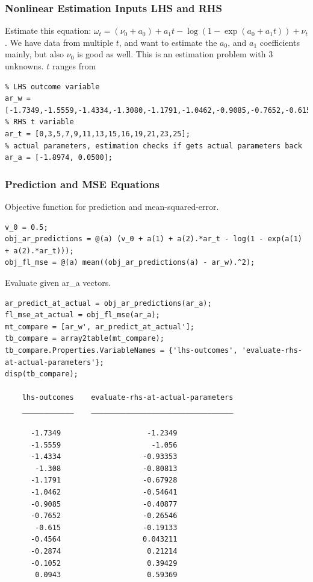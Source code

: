 \documentclass[
]{book}
\begin{document}
\hypertarget{nonlinear-estimation-inputs-lhs-and-rhs}{%
\subsubsection{Nonlinear Estimation Inputs LHS and RHS}\label{nonlinear-estimation-inputs-lhs-and-rhs}}

Estimate this equation:
\(\omega_t =\left(\nu_0 +a_0 \right)+a_1 t-\log \left(1-\exp \left(a_0 +a_1 t\right)\right)+\nu_t\).
We have data from multiple \(t\), and want to estimate the \(a_0\), and
\(a_1\) coefficients mainly, but also \(\nu_0\) is good as well. This is an
estimation problem with 3 unknowns. \(t\) ranges from

\begin{verbatim}
% LHS outcome variable
ar_w = [-1.7349,-1.5559,-1.4334,-1.3080,-1.1791,-1.0462,-0.9085,-0.7652,-0.6150,-0.4564,-0.2874,-0.1052,0.0943];
% RHS t variable
ar_t = [0,3,5,7,9,11,13,15,16,19,21,23,25];
% actual parameters, estimation checks if gets actual parameters back
ar_a = [-1.8974, 0.0500];
\end{verbatim}

\hypertarget{prediction-and-mse-equations}{%
\subsubsection{Prediction and MSE Equations}\label{prediction-and-mse-equations}}

Objective function for prediction and mean-squared-error.

\begin{verbatim}
v_0 = 0.5;
obj_ar_predictions = @(a) (v_0 + a(1) + a(2).*ar_t - log(1 - exp(a(1) + a(2).*ar_t)));
obj_fl_mse = @(a) mean((obj_ar_predictions(a) - ar_w).^2);
\end{verbatim}

Evaluate given ar\_a vectors.

\begin{verbatim}
ar_predict_at_actual = obj_ar_predictions(ar_a);
fl_mse_at_actual = obj_fl_mse(ar_a);
mt_compare = [ar_w', ar_predict_at_actual'];
tb_compare = array2table(mt_compare);
tb_compare.Properties.VariableNames = {'lhs-outcomes', 'evaluate-rhs-at-actual-parameters'};
disp(tb_compare);

    lhs-outcomes    evaluate-rhs-at-actual-parameters
    ____________    _________________________________

      -1.7349                    -1.2349             
      -1.5559                     -1.056             
      -1.4334                   -0.93353             
       -1.308                   -0.80813             
      -1.1791                   -0.67928             
      -1.0462                   -0.54641             
      -0.9085                   -0.40877             
      -0.7652                   -0.26546             
       -0.615                   -0.19133             
      -0.4564                   0.043211             
      -0.2874                    0.21214             
      -0.1052                    0.39429             
       0.0943                    0.59369             
\end{verbatim}
\end{document}
